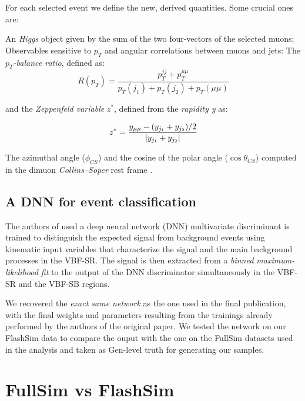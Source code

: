 For each selected event we define the new, derived quantities. Some crucial ones are:

\begin{outline}
\1 An \emph{Higgs} object given by the sum of the two four-vectors of the selected muons;
\1 Observables sensitive to $p_T$ and angular correlations between muons and jets: The $p_T$\emph{-balance ratio}, defined as:
\[R(p_T) = \frac{p_T^{jj}+p_T^{\mu\mu}}{p_T(j_1) + p_T(j_2) + p_T(\mu\mu)}\]

and the \emph{Zeppenfeld variable} $z^*$, defined from the \emph{rapidity y} as:

\[z^* = \frac{y_{\mu\mu} - (y_{j_1} + y_{j_2})/2}{\abs{y_{j_1} + y_{j_2}}}\]

\1  The azimuthal angle ($\phi_{CS}$) and the cosine of the polar angle ($\cos\theta_{CS}$) computed in the dimuon \emph{Collins–Soper} rest frame \cite{PhysRevD.16.2219}.
\end{outline}

\subsection{A DNN for event classification}
The authors of \cite{CMS-PAS-HIG-19-006} used a deep neural network (DNN) multivariate discriminant is trained to distinguish the expected signal from background events using kinematic input variables that characterize the signal and the main background processes in the VBF-SR. The signal is then extracted from a \emph{binned maximum-likelihood fit} to the output of the DNN discriminator simultaneously in the VBF-SR and the VBF-SB regions. 

We recovered the \emph{exact same network} as the one used in the final publication, with the final weights and parameters resulting from the trainings already performed by the authors of the original paper. We tested the network on our FlashSim data to compare the ouput with the one on the FullSim datasets used in the analysis and taken as Gen-level truth for generating our samples.




\section{FullSim vs FlashSim}

